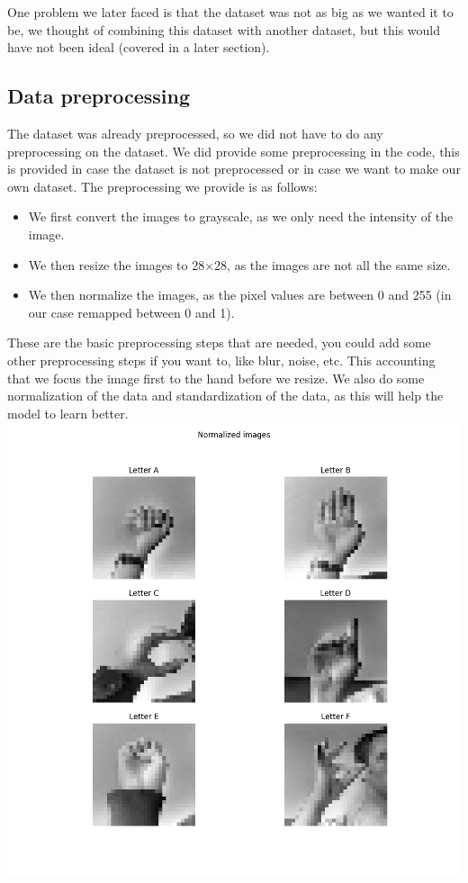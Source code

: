 \documentclass[../paper.tex]{subfiles}
\begin{document}
    One problem we later faced is that the dataset was not as big as we wanted it to be,
    we thought of combining this dataset with another dataset, but this would have not been ideal (covered in a later section).

    \subsection{Data preprocessing}
    The dataset was already preprocessed, so we did not have to do any preprocessing on the dataset. 
    We did provide some preprocessing in the code, this is provided in case the dataset is not preprocessed or in case we want to make our own dataset.
    The preprocessing we provide is as follows:
    \begin{itemize} 
        \item We first convert the images to grayscale, as we only need the intensity of the image.
        \item We then resize the images to 28$\times$28, as the images are not all the same size.
        \item We then normalize the images, as the pixel values are between 0 and 255 (in our case remapped between 0 and 1).
    \end{itemize} 
    These are the basic preprocessing steps that are needed, you could add some other preprocessing steps if you want to, like blur, noise, etc.
    This accounting that we focus the image first to the hand before we resize.
    We also do some normalization of the data and standardization of the data, as this will help the model to learn better. 
    \includegraphics[width=\linewidth]{letters_grid_normalized_6}
\end{document}
